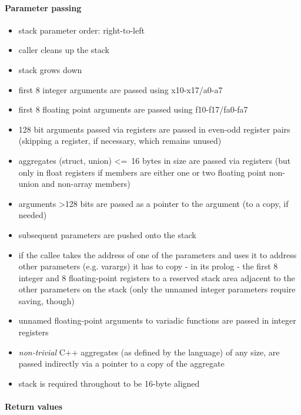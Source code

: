 \paragraph{Parameter passing}

\begin{itemize}
\item stack parameter order: right-to-left
\item caller cleans up the stack
\item stack grows down
\item first 8 integer arguments are passed using x10-x17/a0-a7
\item first 8 floating point arguments are passed using f10-f17/fa0-fa7
\item 128 bit arguments passed via registers are passed in even-odd register pairs (skipping a register, if necessary, which remains unused)
\item aggregates (struct, union) \textless=\ 16 bytes in size are passed via registers (but only in float registers if members are either one or two floating point non-union and non-array members)
\item arguments \textgreater 128 bits are passed as a pointer to the argument (to a copy, if needed)
\item subsequent parameters are pushed onto the stack
\item if the callee takes the address of one of the parameters and uses it to address other parameters (e.g. varargs) it has to copy - in its prolog - the first 8 integer
and 8 floating-point registers to a reserved stack area adjacent to the other parameters on the stack (only the unnamed integer parameters require saving, though)
\item unnamed floating-point arguments to variadic functions are passed in integer registers
\item {\it non-trivial} C++ aggregates (as defined by the language) of any size, are passed indirectly via a pointer to a copy of the aggregate
\item stack is required throughout to be 16-byte aligned
\end{itemize}

\paragraph{Return values}

